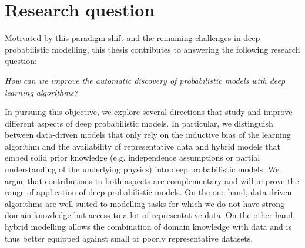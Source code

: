 \section{Research question}

Motivated by this paradigm shift and the remaining challenges in deep probabilistic modelling, this thesis contributes to answering the following research question:
\begin{center}
  \textit{How can we improve the automatic discovery of probabilistic models with deep learning algorithms?}
\end{center}
In pursuing this objective, we explore several directions that study and improve different aspects of deep probabilistic models. In particular, we distinguish between data-driven models that only rely on the inductive bias of the learning algorithm and the availability of representative data and hybrid models that embed solid prior knowledge (e.g. independence assumptions or partial understanding of the underlying physics) into deep probabilistic models. We argue that contributions to both aspects are complementary and will improve the range of application of deep probabilistic models. On the one hand, data-driven algorithms are well suited to modelling tasks for which we do not have strong domain knowledge but access to a lot of representative data. On the other hand, hybrid modelling allows the combination of domain knowledge with data and is thus better equipped against small or poorly representative datasets.





